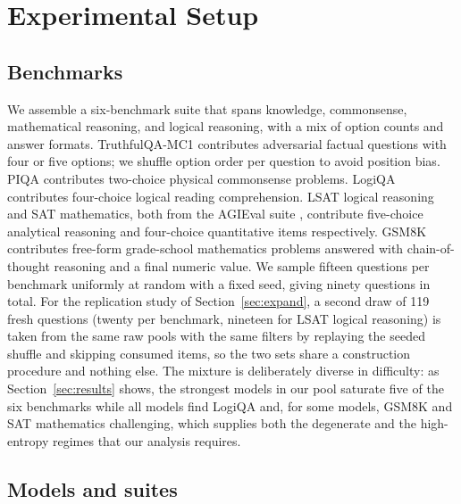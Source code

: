 \section{Experimental Setup}
\label{sec:setup}

\subsection{Benchmarks}

We assemble a six-benchmark suite that spans knowledge, commonsense, mathematical reasoning, and logical reasoning, with a mix of option counts and answer formats. TruthfulQA-MC1 \citep{lin2022truthfulqa} contributes adversarial factual questions with four or five options; we shuffle option order per question to avoid position bias. PIQA \citep{bisk2020piqa} contributes two-choice physical commonsense problems. LogiQA \citep{liu2020logiqa} contributes four-choice logical reading comprehension. LSAT logical reasoning and SAT mathematics, both from the AGIEval suite \citep{zhong2023agieval}, contribute five-choice analytical reasoning and four-choice quantitative items respectively. GSM8K \citep{cobbe2021training} contributes free-form grade-school mathematics problems answered with chain-of-thought reasoning and a final numeric value. We sample fifteen questions per benchmark uniformly at random with a fixed seed, giving ninety questions in total. For the replication study of Section~\ref{sec:expand}, a second draw of 119 fresh questions (twenty per benchmark, nineteen for LSAT logical reasoning) is taken from the same raw pools with the same filters by replaying the seeded shuffle and skipping consumed items, so the two sets share a construction procedure and nothing else. The mixture is deliberately diverse in difficulty: as Section~\ref{sec:results} shows, the strongest models in our pool saturate five of the six benchmarks while all models find LogiQA and, for some models, GSM8K and SAT mathematics challenging, which supplies both the degenerate and the high-entropy regimes that our analysis requires.

\subsection{Models and suites}

